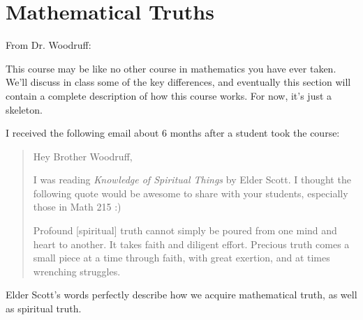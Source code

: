 \documentclass[10pt,]{book}
\theoremstyle{plain}
\theoremstyle{definition}
\theoremstyle{definition}
\theoremstyle{definition}
\theoremstyle{definition}
\theoremstyle{definition}
\numberwithin{equation}{section}
\begin{document}
\chapter*{Mathematical Truths}\label{preface-1}
From Dr. Woodruff:%
\par
This course may be like no other course in mathematics you have ever taken. We'll discuss in class some of the key differences, and eventually this section will contain a complete description of how this course works. For now, it's just a skeleton.%
\par
I received the following email about 6 months after a student took the course:%
\begin{quote}\hypertarget{blockquote-1}{}
Hey Brother Woodruff,%
\par
I was reading \emph{Knowledge of Spiritual Things} by Elder Scott. I thought the following quote would be awesome to share with your students, especially those in Math 215 :)%
\par
Profound [spiritual] truth cannot simply be poured from one mind and heart to another. It takes faith and diligent effort. Precious truth comes a small piece at a time through faith, with great exertion, and at times wrenching struggles.%
\end{quote}
Elder Scott's words perfectly describe how we acquire mathematical truth, as well as spiritual truth.%
\end{document}
